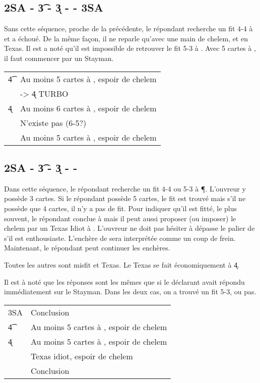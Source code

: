 \documentclass[a4paper,12pt]{article}
\begin{document}
\subsection*{2SA - \t3 - \k3 -  - 3SA}
Sans cette séquence, proche de la précédente, le répondant recherche un fit 4-4 à \C et a échoué.
De la même façon, il ne reparle qu'avec une main de chelem, et en Texas.
Il est a noté qu'il est impossible de retrouver le fit 5-3 à \C. Avec 5 cartes à \C, il faut commencer par un Stayman.

\begin{tabular}{ll}
  \t4 & Au moins 5 cartes à \K, espoir de chelem\\
 & -> \k4 TURBO\\
 \k4 & Au moins 6 cartes à \C, espoir de chelem\\
 \co4 & N'existe pas (6-5?)\\ 
 \p4 &  Au moins 5 cartes à \T, espoir de chelem\\

\end{tabular}


\subsection*{2SA - \t3 - \k3 -  - }
Dans cette séquence, le répondant recherche un fit 4-4 ou 5-3 à \P. L'ouvreur y possède 3 cartes. Si le répondant possède 5 cartes, le fit est trouvé mais s'il ne possède que 4 cartes, il n'y a pas de fit. Pour indiquer qu'il est fitté, le plus souvent, le répondant conclue à  mais il peut aussi proposer (ou imposer) le chelem par un Texas Idiot à . L'ouvreur ne doit pas hésiter à dépasse le palier de   s'il est enthousiaste. L'enchère de  sera interprétée comme un coup de frein. Maintenant, le répondant peut continuer les enchères.

Toutes les autres sont misfit et Texas. Le Texas \T se fait économiquement à \k4.

Il est à noté que les réponses sont les mêmes que si le déclarant avait répondu immédiatement  sur le Stayman. Dans les deux cas, on a trouvé un fit 5-3, ou pas.

\begin{tabular}{ll}
 3SA & Conclusion\\
  \t4 & Au moins 5 cartes à \K, espoir de chelem\\
 \k4 &  Au moins 5 cartes à \T, espoir de chelem\\
  \co4 &Texas idiot, espoir de chelem\\
  \p4 & Conclusion\\
\end{tabular}
\end{document}
